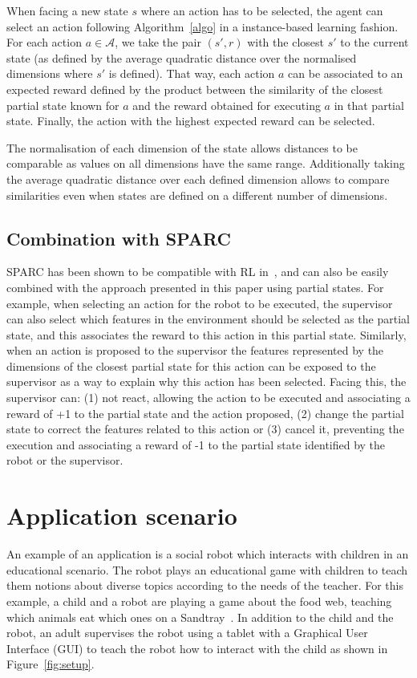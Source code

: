 \documentclass[letterpaper]{article} %
\begin{document}
When facing a new state $s$ where an action has to be selected, the agent can
select an action following Algorithm~\ref{algo} in a instance-based learning
fashion. For each action $a \in \mathcal{A}$, we take the pair $(s',r)$ with the
closest $s'$ to the current state (as defined by the average quadratic distance
over the normalised dimensions where $s'$ is defined). That way, each action $a$
can be associated to an expected reward defined by the product between the
similarity of the closest partial state known for $a$ and the reward obtained
for executing $a$ in that partial state.  Finally, the action with the highest
expected reward can be selected.

The normalisation of each dimension of the state allows distances to be
comparable as values on all dimensions have the same range. Additionally taking
the average quadratic distance over each defined dimension allows to compare
similarities even when states are defined on a different number of dimensions.

\subsection{Combination with SPARC}

SPARC has been shown to be compatible with RL in~\cite{senft2017supervised}, and
can also be easily combined with the approach presented in this paper using
partial states. For example, when selecting an action for the robot to be
executed, the supervisor can also select which features in the environment
should be selected as the partial state, and this associates the reward to this
action in this partial state. Similarly, when an action is proposed to the
supervisor the features represented by the dimensions of the closest partial
state for this action can be exposed to the supervisor as a way to explain why
this action has been selected. Facing this, the supervisor can: (1) not react,
allowing the action to be executed and associating a reward of +1 to the partial
state and the action proposed, (2) change the partial state to correct the
features related to this action or (3) cancel it, preventing the execution and
associating a reward of -1 to the partial state identified by the robot or the
supervisor. 

\section{Application scenario}

An example of an application is a social robot which interacts with children in
an educational scenario.  The robot plays an educational game with children to
teach them notions about diverse topics according to the needs of the teacher.
For this example, a child and a robot are playing a game about the food web,
teaching which animals eat which ones on a Sandtray~\cite{baxter2012touchscreen}.
In addition to the child and the robot, an adult supervises the robot using a
tablet with a Graphical User Interface (GUI) to teach the robot how to interact
with the child as shown in Figure~\ref{fig:setup}.
\end{document}
